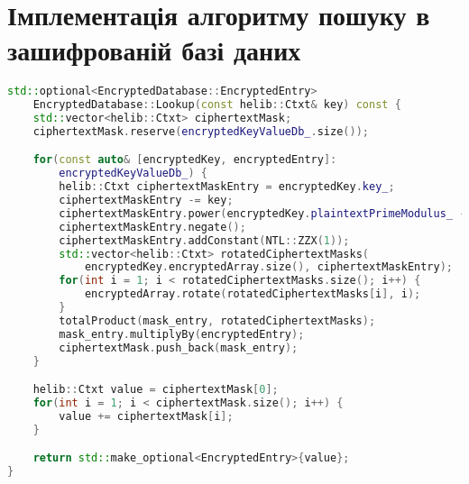 
\appendix

\chapter{Імплементація алгоритму пошуку в зашифрованій базі даних}
\label{appendix:a}
\small
\begin{lstlisting}[language=c++, tabsize=1]
std::optional<EncryptedDatabase::EncryptedEntry> 
    EncryptedDatabase::Lookup(const helib::Ctxt& key) const {
    std::vector<helib::Ctxt> ciphertextMask;
    ciphertextMask.reserve(encryptedKeyValueDb_.size());

    for(const auto& [encryptedKey, encryptedEntry]: 
        encryptedKeyValueDb_) {
        helib::Ctxt ciphertextMaskEntry = encryptedKey.key_;
        ciphertextMaskEntry -= key; 
        ciphertextMaskEntry.power(encryptedKey.plaintextPrimeModulus_ - 1);
        ciphertextMaskEntry.negate();
        ciphertextMaskEntry.addConstant(NTL::ZZX(1));
        std::vector<helib::Ctxt> rotatedCiphertextMasks(
            encryptedKey.encryptedArray.size(), ciphertextMaskEntry);
        for(int i = 1; i < rotatedCiphertextMasks.size(); i++) {
            encryptedArray.rotate(rotatedCiphertextMasks[i], i);
        }
        totalProduct(mask_entry, rotatedCiphertextMasks);
        mask_entry.multiplyBy(encryptedEntry);
        ciphertextMask.push_back(mask_entry);
    }

    helib::Ctxt value = ciphertextMask[0];
    for(int i = 1; i < ciphertextMask.size(); i++) {
        value += ciphertextMask[i];
    }

    return std::make_optional<EncryptedEntry>{value};
}
\end{lstlisting}
\par

